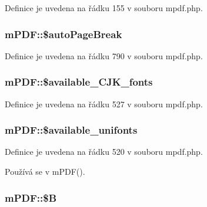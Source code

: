 Definice je uvedena na řádku 155 v souboru mpdf.\-php.

\hypertarget{classm_p_d_f_a8e3bc3d1ebf06e10578694b30960b569}{
\subsubsection[{\$auto\-Page\-Break}]{\setlength{\rightskip}{0pt plus 5cm}m\-P\-D\-F\-::\$auto\-Page\-Break}}\label{classm_p_d_f_a8e3bc3d1ebf06e10578694b30960b569}


Definice je uvedena na řádku 790 v souboru mpdf.\-php.

\hypertarget{classm_p_d_f_a7603165ca11db8cc033e859bfa5e955c}{
\subsubsection[{\$available\-\_\-\-C\-J\-K\-\_\-fonts}]{\setlength{\rightskip}{0pt plus 5cm}m\-P\-D\-F\-::\$available\-\_\-\-C\-J\-K\-\_\-fonts}}\label{classm_p_d_f_a7603165ca11db8cc033e859bfa5e955c}


Definice je uvedena na řádku 527 v souboru mpdf.\-php.

\hypertarget{classm_p_d_f_a0d267d11816f00bad05fe54b7eff4a24}{
\subsubsection[{\$available\-\_\-unifonts}]{\setlength{\rightskip}{0pt plus 5cm}m\-P\-D\-F\-::\$available\-\_\-unifonts}}\label{classm_p_d_f_a0d267d11816f00bad05fe54b7eff4a24}


Definice je uvedena na řádku 520 v souboru mpdf.\-php.



Používá se v m\-P\-D\-F().

\hypertarget{classm_p_d_f_afadb7208eb9df23c7ec0d5d1fa270388}{
\subsubsection[{\$\-B}]{\setlength{\rightskip}{0pt plus 5cm}m\-P\-D\-F\-::\$\-B}}\label{classm_p_d_f_afadb7208eb9df23c7ec0d5d1fa270388}


